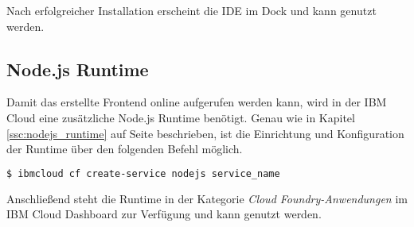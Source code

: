 Nach erfolgreicher Installation erscheint die IDE im Dock und kann genutzt werden.

\subsection{Node.js Runtime}
Damit das erstellte Frontend online aufgerufen werden kann, wird in der IBM Cloud eine zusätzliche Node.js Runtime
benötigt. Genau wie in Kapitel \ref{ssc:nodejs_runtime} auf Seite \pageref{ssc:nodejs_runtime} beschrieben, ist die
Einrichtung und Konfiguration der Runtime über den folgenden Befehl möglich.

\begin{lstlisting}[language=bash, caption=Instanziierung der Node.js Runtime, label=ls:vorbereitung_nodejsdashboard]
    $ ibmcloud cf create-service nodejs service_name
\end{lstlisting}

Anschließend steht die Runtime in der Kategorie \textit{Cloud Foundry-Anwendungen} im IBM Cloud Dashboard zur Verfügung
und kann genutzt werden.